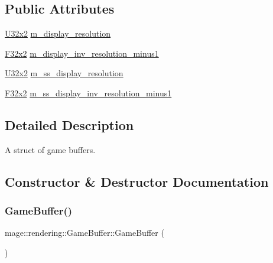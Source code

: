 \subsection*{Public Attributes}
\begin{DoxyCompactItemize}
\item 
\hyperlink{namespacemage_a88e05bff0300120c013285d3dcad95c5}{U32x2} \hyperlink{structmage_1_1rendering_1_1_game_buffer_a0d1ae294ea443c48c348af75442a8f54}{m\+\_\+display\+\_\+resolution}
\item 
\hyperlink{namespacemage_aa87237ad091f5cd7da612b8523fc108f}{F32x2} \hyperlink{structmage_1_1rendering_1_1_game_buffer_a046916a46d80f979ac4f16c2ba58d8ef}{m\+\_\+display\+\_\+inv\+\_\+resolution\+\_\+minus1}
\item 
\hyperlink{namespacemage_a88e05bff0300120c013285d3dcad95c5}{U32x2} \hyperlink{structmage_1_1rendering_1_1_game_buffer_a76b01da64f8eb8f7ba431371a71d35a4}{m\+\_\+ss\+\_\+display\+\_\+resolution}
\item 
\hyperlink{namespacemage_aa87237ad091f5cd7da612b8523fc108f}{F32x2} \hyperlink{structmage_1_1rendering_1_1_game_buffer_a471b606cff83755f74f855c780c3dc2a}{m\+\_\+ss\+\_\+display\+\_\+inv\+\_\+resolution\+\_\+minus1}
\end{DoxyCompactItemize}


\subsection{Detailed Description}
A struct of game buffers. 

\subsection{Constructor \& Destructor Documentation}
\hypertarget{structmage_1_1rendering_1_1_game_buffer_ad38868666dffd8967a04e87a6ff9ebc5}{}\label{structmage_1_1rendering_1_1_game_buffer_ad38868666dffd8967a04e87a6ff9ebc5} 
\subsubsection{\texorpdfstring{Game\+Buffer()}{GameBuffer()}\hspace{0.1cm}{\footnotesize\ttfamily [1/3]}}
{\footnotesize\ttfamily mage\+::rendering\+::\+Game\+Buffer\+::\+Game\+Buffer (\begin{DoxyParamCaption}{ }\end{DoxyParamCaption})\hspace{0.3cm}{\ttfamily [noexcept]}}

